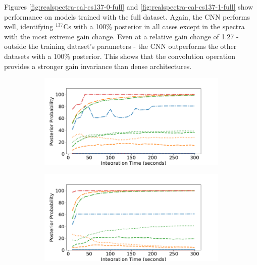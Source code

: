 Figures \ref{fig:realspectra-cal-cs137-0-full} and \ref{fig:realspectra-cal-cs137-1-full} show performance on models trained with the full dataset. Again, the CNN performs well, identifying $^{137}$Cs with a 100\% posterior in all cases except in the spectra with the most extreme gain change. Even at a relative gain change of 1.27 - outside the training dataset's parameters - the CNN outperforms the other datasets with a 100\% posterior. This shows that the convolution operation provides a stronger gain invariance than dense architectures. 

\begin{figure}[H]
     \centering
     \begin{subfigure}[b]{0.49\textwidth}
         \centering
         \includegraphics[width=\textwidth]{images/realspectra-cal-cs137-0-easy.png}
         \caption{}
         \label{fig:realspectra-cal-cs137-0-easy}
     \end{subfigure}
     \hfill
     \begin{subfigure}[b]{0.49\textwidth}
         \centering
         \includegraphics[width=\textwidth]{images/realspectra-cal-cs137-1-easy.png}
         \caption{}
         \label{fig:realspectra-cal-cs137-1-easy}
     \end{subfigure}


\end{figure}
